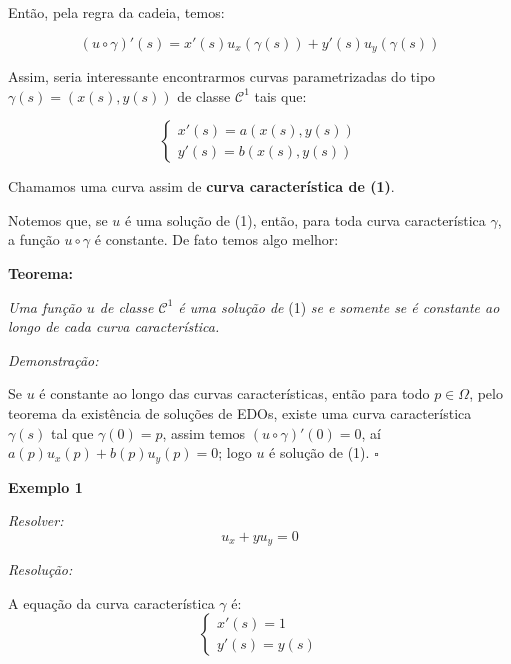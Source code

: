 \documentclass[11pt,twoside,a4paper]{book}
\begin{document}
\smallskip
\noindent
Então, pela regra da cadeia, temos:

\begin{equation*}
    (u\circ\gamma)'(s)=x'(s) u_x(\gamma(s))+y'(s) u_y(\gamma(s))
\end{equation*}

\smallskip
\noindent
Assim, seria interessante encontrarmos curvas parametrizadas do tipo $\gamma(s)=(x(s),y(s))$ de classe $\mathcal{C}^1$ tais que:

\begin{equation*}
    \begin{cases}
    x'(s)=a(x(s),y(s))       \\
    y'(s)=b(x(s),y(s))      
    \end{cases}
\end{equation*}

\smallskip
\noindent
Chamamos uma curva assim de \textbf{curva característica de (1)}.

\medskip
\noindent
Notemos que, se $u$ é uma solução de (1), então, para toda curva característica $\gamma$, a função $u\circ\gamma$ é constante. De fato temos algo melhor:

\medskip
\noindent
\textbf{Teorema:}

\noindent
\textit{Uma função $u$ de classe $\mathcal{C}^1$ é uma solução de} (1) \textit{se e somente se é constante ao longo de cada curva característica.}

\smallskip
\noindent
\textit{Demonstração:}

\noindent
Se $u$ é constante ao longo das curvas características, então para todo $p\in\Omega$, pelo teorema da existência de soluções de EDOs, existe uma curva característica $\gamma(s)$ tal que $\gamma(0)=p$, assim temos $(u\circ\gamma)'(0)=0$, aí $a(p)u_x(p)+b(p)u_y(p)=0$; logo $u$ é solução de (1). $\square$

\bigskip
\noindent
\textbf{Exemplo 1}

\smallskip
\noindent
\textit{Resolver:}
\begin{equation*}
    u_x+yu_y=0
\end{equation*}

\smallskip
\noindent
\textit{Resolução:}

\smallskip
\noindent
A equação da curva característica $\gamma$ é:
\begin{equation*}
    \begin{cases}
    x'(s)=1       \\
    y'(s)=y(s)     
    \end{cases}
\end{equation*}
\end{document}
